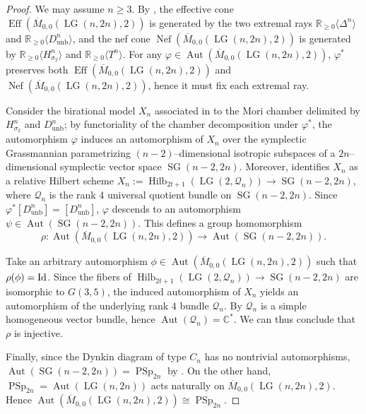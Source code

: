 \documentclass[10pt]{amsart}
\theoremstyle{definition}
\newcommand{\Eff}{\operatorname{Eff}}
\newcommand{\Nef}{\operatorname{Nef}}
\newcommand{\Aut}{\operatorname{Aut}}
\newcommand{\LG}{\operatorname{LG}}
\DeclareMathOperator{\PSp}{PSp}
\theoremstyle{plain} %
\begin{document}
\begin{proof}
We may assume $n\ge 3$. By \cite[Theorem 6.14]{CM}, the effective cone $\Eff(\overline{M}_{0,0}(\LG(n,2n),2))$ is generated by the two extremal rays
$\mathbb{R}_{\ge 0}\langle \Delta^n\rangle$ and $\mathbb{R}_{\ge 0}\langle D^n_{\mathrm{unb}}\rangle$,
and the nef cone $\Nef(\overline{M}_{0,0}(\LG(n,2n),2))$ is generated by 
$\mathbb{R}_{\geq 0}\langle H^n_{\sigma_2}\rangle$ and $\mathbb{R}_{\geq 0}\langle T^n\rangle$. For any $\varphi\in \Aut(\overline{M}_{0,0}(\LG(n,2n),2))$, $\varphi^*$ preserves both $\Eff(\overline{M}_{0,0}(\LG(n,2n),2))$ and $\Nef(\overline{M}_{0,0}(\LG(n,2n),2))$, hence it must fix each extremal ray. 

Consider the birational model $X_n$ associated in \cite[Theorem 6.14]{CM} to the Mori chamber delimited by
$H^n_{\sigma_2}$ and $D^n_{\mathrm{unb}}$; by functoriality of the chamber decomposition under $\varphi^*$,
the automorphism $\varphi$ induces an automorphism of $X_n$ over the symplectic Grassmannian parametrizing $(n-2)$--dimensional isotropic subspaces of a $2n$--dimensional symplectic vector space $\operatorname{SG}(n-2,2n)$. Moreover, \cite[Theorem 6.14]{CM} identifies $X_n$ as a relative Hilbert scheme $X_n:=\operatorname{Hilb}_{2t+1}(\LG(2, \mathcal Q_n))  \rightarrow \operatorname{SG}(n-2,2n)$, where $\mathcal{Q}_n$ is the rank $4$ universal quotient bundle on $\operatorname{SG}(n-2,2n)$. Since $\varphi^*[D^n_{\mathrm{unb}}]=[D^n_{\mathrm{unb}}]$, $\varphi$ descends to an automorphism
$\psi\in \Aut(\operatorname{SG}(n-2,2n))$. This defines a group homomorphism
\[
\rho \colon \Aut(\overline{M}_{0,0}(\LG(n,2n),2))\longrightarrow \Aut(\operatorname{SG}(n-2,2n)).
\]  

Take an arbitrary automorphism $\phi\in\Aut(\overline{M}_{0,0}(\LG(n,2n),2))$ such that $\rho(\phi)={\rm Id}$.
Since the fibers of $\operatorname{Hilb}_{2t+1}(\LG(2, \mathcal Q_n))\rightarrow\operatorname{SG}(n-2, 2n)$ are isomorphic to $G(3, 5)$, the induced automorphism of $X_n$ yields an automorphism of the underlying rank $4$ bundle $\mathcal{Q}_n$. By \cite{Ram66} $\mathcal{Q}_n$ is a simple homogeneous vector bundle, hence $\Aut(\mathcal{Q}_n)=\mathbb{C}^*$. We can thus conclude that $\rho$ is injective.

Finally, since the Dynkin diagram of type $C_n$ has no nontrivial automorphisms, $\Aut(\operatorname{SG}(n-2,2n))=\PSp_{2n}$ by \cite{Dem77}. On the other hand, $\PSp_{2n}=\Aut(\LG(n,2n))$ acts naturally on $\overline{M}_{0,0}(\LG(n,2n),2)$. Hence $\Aut(\overline{M}_{0,0}(\LG(n,2n),2))\cong \PSp_{2n}$.
\end{proof}
\end{document}
